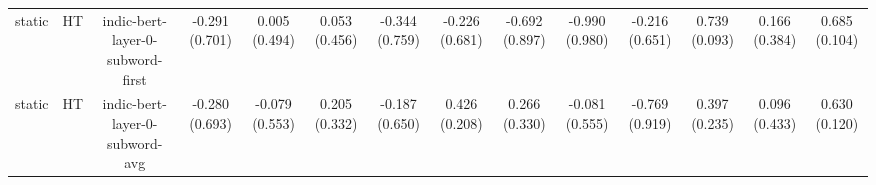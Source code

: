 \begin{sidewaystable}[htb]
\begin{tabular}{@{}cccccccccccccc@{}}
        static & HT & indic-bert-layer-0-subword-first & -0.291 (0.701) & 0.005 (0.494) & 0.053 (0.456) & -0.344 (0.759) & -0.226 (0.681) & -0.692 (0.897) & -0.990 (0.980) & -0.216 (0.651) & 0.739 (0.093) & 0.166 (0.384) & 0.685 (0.104) \\
        static & HT & indic-bert-layer-0-subword-avg & -0.280 (0.693) & -0.079 (0.553) & 0.205 (0.332) & -0.187 (0.650) & 0.426 (0.208) & 0.266 (0.330) & -0.081 (0.555) & -0.769 (0.919) & 0.397 (0.235) & 0.096 (0.433) & 0.630 (0.120) \\
        \bottomrule
    \end{tabular}
\end{sidewaystable}